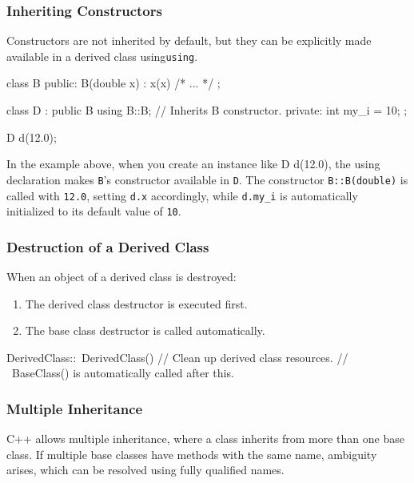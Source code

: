 \subsubsection{Inheriting Constructors}

Constructors are not inherited by default, but they can be explicitly made available in a derived class using\texttt{using}.

\begin{codeblock}[language=C++]
class B {
public:
    B(double x) : x(x) { /* ... */ }
};

class D : public B {
    using B::B; // Inherits B constructor.
private:
    int my_i = 10;
};

D d(12.0);
\end{codeblock}

In the example above, when you create an instance like D d(12.0), the using declaration makes \texttt{B}'s constructor available in \texttt{D}. The constructor \texttt{B::B(double)} is called with \texttt{12.0}, setting \texttt{d.x} accordingly, while \texttt{d.my\_i} is automatically initialized to its default value of \texttt{10}.

\subsubsection{Destruction of a Derived Class}

When an object of a derived class is destroyed:

\begin{enumerate}
    \item The derived class destructor is executed first.
    \item The base class destructor is called automatically.
\end{enumerate}

\begin{codeblock}[language=C++, numbers=none]
DerivedClass::~DerivedClass() {
    // Clean up derived class resources.
    // ~BaseClass() is automatically called after this.
}
\end{codeblock}

\subsubsection{Multiple Inheritance}

C++ allows multiple inheritance, where a class inherits from more than one base class. If multiple base classes have methods with the same name, ambiguity arises, which can be resolved using fully qualified names.

